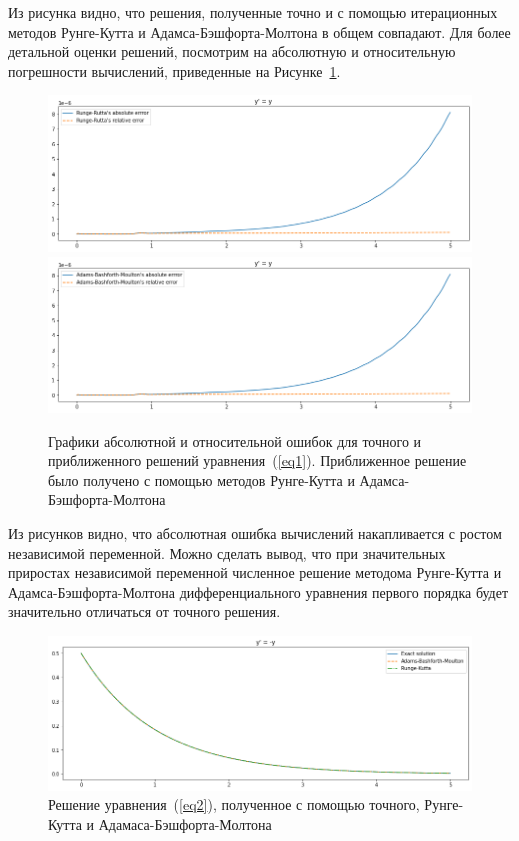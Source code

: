 Из рисунка видно, что решения, полученные точно и с помощью итерационных методов Рунге-Кутта и Адамса-Бэшфорта-Молтона в общем совпадают. Для более детальной оценки решений, посмотрим на абсолютную и относительную погрешности вычислений, приведенные на Рисунке~\ref{fig:errors1}.
\newpage
\begin{figure}
    \centering
    \includegraphics[width=\linewidth]{Figures/rk1.png}
    \includegraphics[width=\linewidth]{Figures/bm1.png}
    \caption{Графики абсолютной и относительной ошибок для точного и приближенного решений уравнения~(\ref{eq1}). Приближенное решение было получено с помощью методов Рунге-Кутта и Адамса-Бэшфорта-Молтона}
    \label{fig:errors1}
\end{figure}

Из рисунков видно, что абсолютная ошибка вычислений накапливается с ростом независимой переменной. Можно сделать вывод, что при значительных приростах независимой переменной численное решение методома Рунге-Кутта и Адамса-Бэшфорта-Молтона дифференциального уравнения первого порядка будет значительно отличаться от точного решения.
\newpage
\begin{figure}
    \centering
    \includegraphics[width=\linewidth]{Figures/res2.png}
    \caption{Решение уравнения~(\ref{eq2}), полученное с помощью точного, Рунге-Кутта и Адамаса-Бэшфорта-Молтона}
    \label{fig:my_label}
\end{figure}

